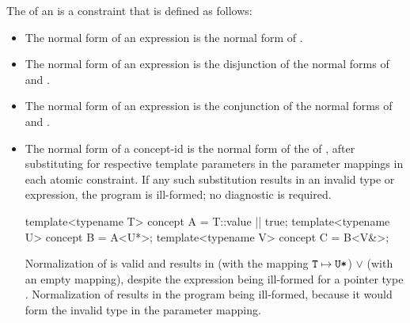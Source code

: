\documentclass{wg21}
\begin{document}
\pnum
The  of an   is
a constraint that is defined as follows:
%
\begin{itemize}
\item
The normal form of an expression  is
the normal form of .

\item
The normal form of an expression  is
the disjunction of
the normal forms of  and .

\item
The normal form of an expression 
is the conjunction of
the normal forms of  and .

\item
The normal form of a concept-id 
is the normal form of the  of ,
after substituting  for
 respective template parameters in the
parameter mappings in each atomic constraint.
If any such substitution results in an invalid type or expression,
the program is ill-formed; no diagnostic is required.
\begin{example}
\begin{codeblock}
    template<typename T> concept A = T::value || true;
    template<typename U> concept B = A<U*>;
    template<typename V> concept C = B<V&>;
\end{codeblock}
Normalization of  
is valid and results in
 (with the mapping $\texttt{T} \mapsto \texttt{U*}$)
$\lor$
 (with an empty mapping),
despite the expression  being ill-formed
for a pointer type .
Normalization of  
results in the program being ill-formed,
because it would form the invalid type 
in the parameter mapping.
\end{example}

\end{itemize}
\end{document}

